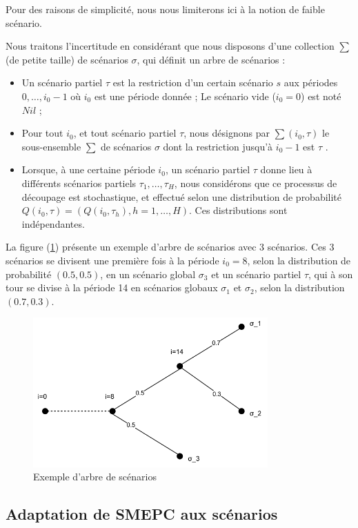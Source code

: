 {Pour des raisons de simplicité, nous nous limiterons ici à la notion de faible scénario.

Nous traitons l'incertitude en considérant que nous disposons d'une collection  $\sum$ (de petite taille) de scénarios $\sigma$, qui définit un arbre de scénarios : 

\begin{itemize}[label=$\square$]	
\item Un scénario partiel $\tau$ est la restriction d'un certain scénario $s$ aux périodes $0, \dots, i_0-1$ où $i_0$ est une période donnée ; Le scénario vide ($i_0 = 0$) est noté $Nil$ ;
\item Pour tout $i_0$, et tout scénario partiel $\tau$, nous désignons par $\sum(i_0,\tau )$ le sous-ensemble $\sum$ de scénarios $\sigma$ dont la restriction jusqu'à $i_0-1$ est $\tau$ .
\item Lorsque, à une certaine période $i_0$, un scénario partiel $\tau$ donne lieu à différents scénarios partiels $\tau_1, \dots, \tau_H$, nous considérons que ce processus de découpage est stochastique, et effectué selon une distribution de probabilité $Q(i_0,\tau) = (Q(i_0,\tau_h), h = 1, \dots, H)$. Ces distributions sont indépendantes. 
\end{itemize}

 La figure (\ref{scenarios}) présente un exemple d'arbre de scénarios avec 3 scénarios. Ces 3 scénarios se divisent une première fois à la période $i_0 = 8$, selon la distribution de probabilité $(0.5, 0.5)$, en un scénario global $\sigma_3$ et un scénario partiel $\tau$, qui à son tour se divise à la période 14 en scénarios globaux $\sigma_1$ et $\sigma_2$, selon la distribution $(0.7, 0.3)$. 
 
 \begin{figure}
 	\centerline{
 		\includegraphics[width=9cm]{images_these/scenarios.pdf}}
 	\caption{Exemple d'arbre de scénarios}\label{scenarios}
 \end{figure}
 \subsection{Adaptation de SMEPC aux scénarios}
 
}
